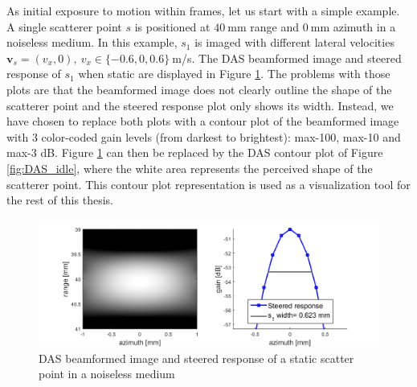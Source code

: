 As initial exposure to motion within frames, let us start with a simple example. A single scatterer point $s$ is positioned at $40~$mm range and $0~$mm azimuth in a noiseless medium. In this example, $s_1$ is imaged with different lateral velocities $\boldsymbol{v}_s = (v_x, 0),~ v_x \in \{-0.6, 0, 0.6\}~$m/s.
The DAS beamformed image and steered response of $s_1$ when static are displayed in Figure \ref{fig:DAS_steered}. The problems with those plots are that the beamformed image does not clearly outline the shape of the scatterer point and the steered response plot only shows its width. Instead, we have chosen to replace both plots with a contour plot of the beamformed image with 3 color-coded gain levels (from darkest to brightest): max-100, max-10 and max-3 dB.
Figure \ref{fig:DAS_steered} can then be replaced by the DAS contour plot of Figure \ref{fig:DAS_idle}, where the white area represents the perceived shape of the scatterer point.
This contour plot representation is used as a visualization tool for the rest of this thesis.

\begin{figure}[ht]
    \centering
    \includegraphics[width=\linewidth]{./images/results/2.1/DAS_steered2.png}
	\caption{DAS beamformed image and steered response of a static scatter point in a noiseless medium}
	\label{fig:DAS_steered}
\end{figure}

